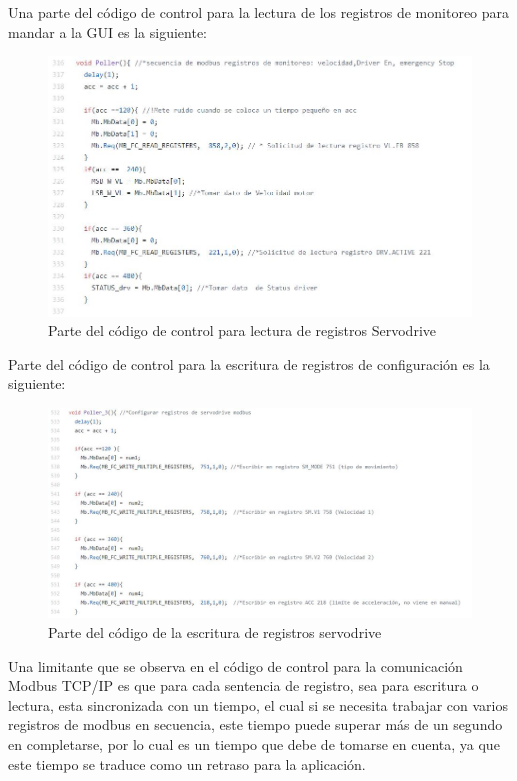 \documentclass[12pt,titlepage]{article}
\begin{document}
Una parte del código de control para la lectura de los registros de monitoreo para mandar a la GUI es la siguiente: \\ 
 \begin{figure}[htbp]
\hspace*{2.2cm} 
\includegraphics[scale=0.55]{code_read}
\caption{Parte del código de control para lectura de registros Servodrive }
\end{figure}
\newpage
Parte del código de control para la escritura de registros de configuración es la siguiente: \\ 
  \begin{figure}[htbp]
\hspace*{0.2cm} 
\includegraphics[scale=0.60]{write_code}
\caption{Parte del código de la escritura de registros servodrive }
\end{figure}

Una limitante que se observa en el código de control para la comunicación Modbus TCP/IP es que para cada sentencia de registro, sea para escritura o lectura, esta sincronizada con un tiempo, el cual si se necesita trabajar con varios registros de modbus en secuencia, este tiempo puede superar más de un segundo en completarse, por lo cual es un tiempo que debe de tomarse en cuenta, ya que este tiempo se traduce como un retraso para la aplicación. \\ 
\end{document}
